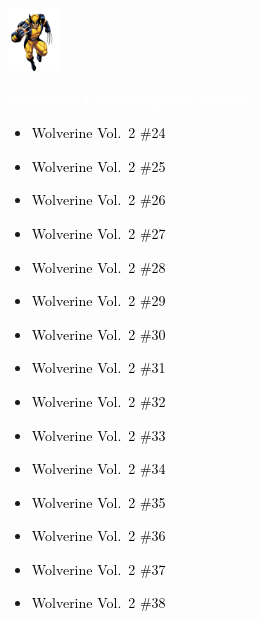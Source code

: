 \documentclass[12pt]{article}
\newcommand{\checkbox}{\raisebox{0.0ex}{\fbox{\rule{0ex}{1.5ex} \rule{1.5ex}{0ex}}}}
\begin{document}
\begin{center}
    \vspace*{2cm}
    \includegraphics[width=0.1\textwidth]{wolverine.png}
    \vspace{0.3cm}

    {\Huge \textbf{\textcolor{white}{Wolverine Chronological Checklist}}}
\end{center}

\vspace{0.3cm}
\noindent
\begin{tcolorbox}[
  colback=white!95!gray,
  colframe=black,
  width=\textwidth,
  arc=4mm,
  auto outer arc,
  boxrule=0.8pt,
  left=8pt,right=8pt,top=8pt,bottom=8pt
]
\begin{itemize}[left=0pt,label={\checkbox}]
  \item \textcolor{black}{Wolverine Vol.\ 2 \#24}
  \item \textcolor{black}{Wolverine Vol.\ 2 \#25}
  \item \textcolor{black}{Wolverine Vol.\ 2 \#26}
  \item \textcolor{black}{Wolverine Vol.\ 2 \#27}
  \item \textcolor{black}{Wolverine Vol.\ 2 \#28}
  \item \textcolor{black}{Wolverine Vol.\ 2 \#29}
  \item \textcolor{black}{Wolverine Vol.\ 2 \#30}
  \item \textcolor{black}{Wolverine Vol.\ 2 \#31}
  \item \textcolor{black}{Wolverine Vol.\ 2 \#32}
  \item \textcolor{black}{Wolverine Vol.\ 2 \#33}
  \item \textcolor{black}{Wolverine Vol.\ 2 \#34}
  \item \textcolor{black}{Wolverine Vol.\ 2 \#35}
  \item \textcolor{black}{Wolverine Vol.\ 2 \#36}
  \item \textcolor{black}{Wolverine Vol.\ 2 \#37}
  \item \textcolor{black}{Wolverine Vol.\ 2 \#38}
\end{itemize}
\end{tcolorbox}
\end{document}
